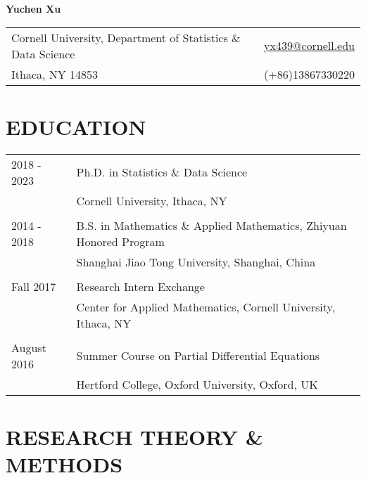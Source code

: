 \documentclass[pdftex,11pt]{article}	%
\newif\ifacademia
\newif\ifus
\begin{document}
 \thispagestyle{empty} %

\begin{center} \huge{\textbf{Yuchen Xu}}\\
\normalsize \end{center}

\indent \begin{tabularx}{\textwidth}{@{} X  r  @{}} 
Cornell University, Department of Statistics \& Data Science & \mbox{\href{mailto:yx439@cornell.edu}{yx439@cornell.edu}} \\
Ithaca, NY 14853 & \ifus(+1)6072621106\else(+86)13867330220\fi \\
\end{tabularx}

\section*{EDUCATION} 
\begin{tabularx}{\textwidth}{ @{} p{2.7cm}  X  @{}}  
	2018 - 2023 & Ph.D. in Statistics \& Data Science\\ %
	& Cornell University, Ithaca, NY  \\
	& \\
	2014 - 2018 & B.S. in Mathematics \& Applied Mathematics, Zhiyuan Honored Program \\ 
	& Shanghai Jiao Tong University, Shanghai, China  \\
	& \\
	Fall 2017 & Research Intern Exchange \\
	& Center for Applied Mathematics, Cornell University, Ithaca, NY \\
	& \\
	August 2016 & Summer Course on Partial Differential Equations \\
	& Hertford College, Oxford University, Oxford, UK \\
\end{tabularx} 

\ifacademia
\section*{RESEARCH THEORY \& METHODS}
\end{document}
